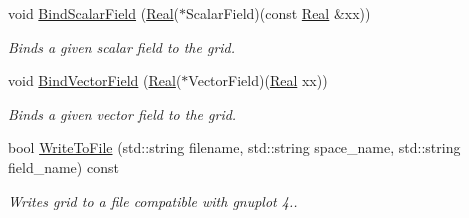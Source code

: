 \begin{DoxyCompactItemize}
void \hyperlink{classmtk_1_1UniStgGrid1D_ab49f0009b66b0a58ae7f70a538f4d12b}{Bind\+Scalar\+Field} (\hyperlink{group__c01-roots_gac080bbbf5cbb5502c9f00405f894857d}{Real}($\ast$Scalar\+Field)(const \hyperlink{group__c01-roots_gac080bbbf5cbb5502c9f00405f894857d}{Real} \&xx))
\begin{DoxyCompactList}\small\item\em Binds a given scalar field to the grid. \end{DoxyCompactList}\item 
void \hyperlink{classmtk_1_1UniStgGrid1D_a5703f1f875f52f6de8f7db5a6250fafa}{Bind\+Vector\+Field} (\hyperlink{group__c01-roots_gac080bbbf5cbb5502c9f00405f894857d}{Real}($\ast$Vector\+Field)(\hyperlink{group__c01-roots_gac080bbbf5cbb5502c9f00405f894857d}{Real} xx))
\begin{DoxyCompactList}\small\item\em Binds a given vector field to the grid. \end{DoxyCompactList}\item 
bool \hyperlink{classmtk_1_1UniStgGrid1D_a6d2c10aa9468a037829f0eb043b898dc}{Write\+To\+File} (std\+::string filename, std\+::string space\+\_\+name, std\+::string field\+\_\+name) const 
\begin{DoxyCompactList}\small\item\em Writes grid to a file compatible with gnuplot 4.. \end{DoxyCompactList}\end{DoxyCompactItemize}
